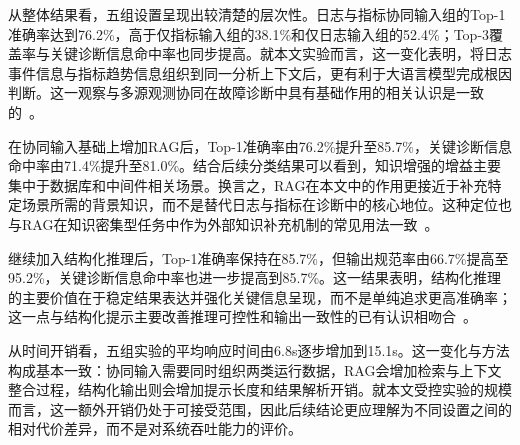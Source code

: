 \begin{table}[htbp]
\centering
\caption{主实验整体结果}
\label{tab:overall-results}
\footnotesize
\setlength{\tabcolsep}{3pt}
\renewcommand{\arraystretch}{1.12}
\end{table}

从整体结果看，五组设置呈现出较清楚的层次性。日志与指标协同输入组的Top-1准确率达到76.2\%，高于仅指标输入组的38.1\%和仅日志输入组的52.4\%；Top-3覆盖率与关键诊断信息命中率也同步提高。就本文实验而言，这一变化表明，将日志事件信息与指标趋势信息组织到同一分析上下文后，更有利于大语言模型完成根因判断。这一观察与多源观测协同在故障诊断中具有基础作用的相关认识是一致的~\cite{soldani2023survey,cheng2023rcasurvey}。

在协同输入基础上增加RAG后，Top-1准确率由76.2\%提升至85.7\%，关键诊断信息命中率由71.4\%提升至81.0\%。结合后续分类结果可以看到，知识增强的增益主要集中于数据库和中间件相关场景。换言之，RAG在本文中的作用更接近于补充特定场景所需的背景知识，而不是替代日志与指标在诊断中的核心地位。这种定位也与RAG在知识密集型任务中作为外部知识补充机制的常见用法一致~\cite{gao2023ragsurvey,zhang2024rag4itops}。

继续加入结构化推理后，Top-1准确率保持在85.7\%，但输出规范率由66.7\%提高至95.2\%，关键诊断信息命中率也进一步提高到85.7\%。这一结果表明，结构化推理的主要价值在于稳定结果表达并强化关键信息呈现，而不是单纯追求更高准确率；这一点与结构化提示主要改善推理可控性和输出一致性的已有认识相吻合~\cite{wei2022cot,wang2023planandsolve,huang2025llmsafety}。

从时间开销看，五组实验的平均响应时间由6.8s逐步增加到15.1s。这一变化与方法构成基本一致：协同输入需要同时组织两类运行数据，RAG会增加检索与上下文整合过程，结构化输出则会增加提示长度和结果解析开销。就本文受控实验的规模而言，这一额外开销仍处于可接受范围，因此后续结论更应理解为不同设置之间的相对代价差异，而不是对系统吞吐能力的评价。

